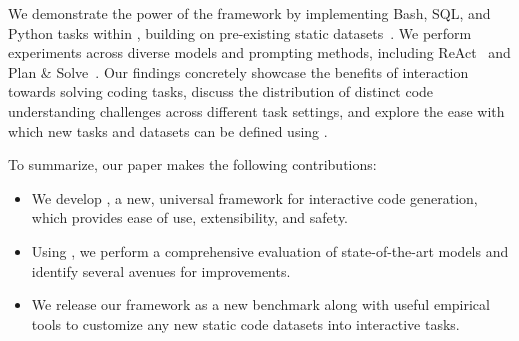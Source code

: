 We demonstrate the power of the framework by implementing Bash, SQL, and Python tasks within \benchmark{}, building on pre-existing static datasets~\cite{zhong2017seq2sql, lin-etal-2018-nl2bash, austin2021program}. We perform experiments across diverse models and prompting methods, including ReAct~\cite{yao2023react} and Plan \& Solve~\cite{wang2023planandsolve}. Our findings concretely showcase the benefits of interaction towards solving coding tasks, discuss the distribution of distinct code understanding challenges across different task settings, and explore the ease with which new tasks and datasets can be defined using \benchmark{}.

To summarize, our paper makes the following contributions:
\begin{itemize}[noitemsep,topsep=0pt]
\item We develop \benchmark{}, a new, universal framework for interactive code generation, which provides ease of use, extensibility, and safety.
\item Using \benchmark{}, we perform a comprehensive evaluation of state-of-the-art models and identify several avenues for improvements.
\item We release our framework as a new benchmark along with useful empirical tools to customize any new static code datasets into interactive tasks.
\end{itemize}












